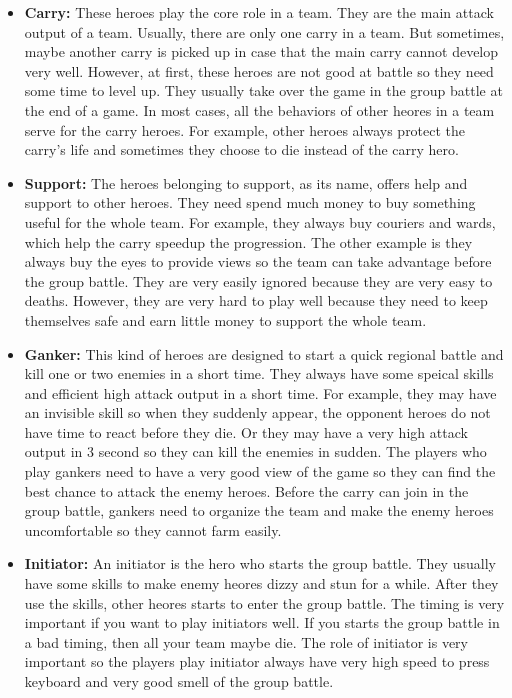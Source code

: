 \begin{itemize}
\item \textbf{Carry:}
These heroes play the core role in a team.
They are the main attack output of a team.
Usually, there are only one carry in a team.
But sometimes, maybe another carry is picked up in case that the main carry cannot develop very well.
However, at first, these heroes are not good at battle so they need some time to level up.
They usually take over the game in the group battle at the end of a game.
In most cases, all the behaviors of other heores in a team serve for the carry heroes.
For example, other heroes always protect the carry's life and sometimes they choose to die instead of the carry hero.
\item \textbf{Support:} 
The heroes belonging to support, as its name, offers help and support to other heroes.
They need spend much money to buy something useful for the whole team.
For example, they always buy couriers and wards, which help the carry speedup the progression.
The other example is they always buy the eyes to provide views so the team can take advantage before the group battle.
They are very easily ignored because they are very easy to deaths. 
However, they are very hard to play well because they need to keep themselves 
safe and earn little money to support the whole team.
\item \textbf{Ganker:}
This kind of heroes are designed to start a quick regional battle and kill one or two enemies in a short time.
They always have some speical skills and efficient high attack output in a short time.
For example, they may have an invisible skill so when they suddenly appear,
the opponent heroes do not have time to react before they die.
Or they may have a very high attack output in 3 second so they can kill the enemies in sudden.
The players who play gankers need to have a very good view of the game so
they can find the best chance to attack the enemy heroes.
Before the carry can join in the group battle,
gankers need to organize the team and make the enemy heroes
uncomfortable so they cannot farm easily.
\item \textbf{Initiator:}
An initiator is the hero who starts the group battle.
They usually have some skills to make enemy heores dizzy and stun for a while.
After they use the skills, other heores starts to enter the group battle.
The timing is very important if you want to play initiators well.
If you starts the group battle in a bad timing, then all your team maybe die.
The role of initiator is very important so the players play initiator always
have very high speed to press keyboard and very good smell of the group battle.
\end{itemize}

